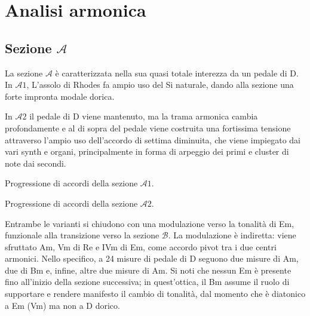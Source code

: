 \documentclass[class=book, crop=false, oneside, 12pt]{standalone}
\begin{document}
    \section{Analisi armonica}
    \label{sec:03-harmony}

    \subsection{Sezione \(\mathcal{A}\)}
    La sezione \(\mathcal{A}\) è caratterizzata nella sua quasi totale interezza da un pedale di D. In \(\mathcal{A}1\), L'assolo di Rhodes fa ampio uso del Si naturale, dando alla sezione una forte impronta modale dorica.     

    In \(\mathcal{A}2\) il pedale di D viene mantenuto, ma la trama armonica cambia profondamente e al di sopra del pedale viene costruita una fortissima tensione attraverso l'ampio uso dell'accordo di settima diminuita, che viene impiegato dai vari synth e organi, principalmente in forma di arpeggio dei primi e cluster di note dai secondi. 
    
    \begin{sheet}[htbp]
        \centering
        \caption{Progressione di accordi della sezione \(\mathcal{A}1\).}
        \label{sheet:sheep-a1_chords}
    \end{sheet}
    
    \begin{sheet}[htbp]
        \centering
        \caption{Progressione di accordi della sezione \(\mathcal{A}2\).}
        \label{sheet:sheep-a2_chords}
    \end{sheet}

    Entrambe le varianti si chiudono con una modulazione verso la tonalità di Em, funzionale alla transizione verso la sezione \(\mathcal{B}\). La modulazione è indiretta: viene sfruttato Am, Vm di Re e IVm di Em,  come accordo pivot tra i due centri armonici. Nello specifico, a 24 misure di pedale di D seguono due misure di Am, due di Bm e, infine, altre due misure di Am. Si noti che nessun Em è presente fino all'inizio della sezione successiva; in quest'ottica,  il Bm assume il ruolo di supportare e rendere manifesto il cambio di tonalità, dal momento che è diatonico a Em (Vm) ma non a D dorico. 
\end{document}
